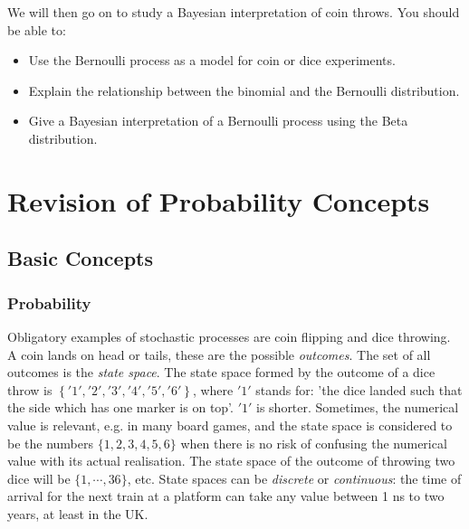 We will then go on to study a Bayesian interpretation of coin throws. You
should be able to:

\begin{itemize}
\item Use the Bernoulli process as a model for coin or dice experiments.
\item Explain the relationship between the binomial and the Bernoulli distribution.
\item Give a Bayesian interpretation of a Bernoulli process using the Beta distribution.
\end{itemize}

\chapter{Revision of Probability Concepts}
\section{Basic Concepts}
\subsection{Probability}

Obligatory examples of stochastic processes are coin flipping and dice throwing.
A coin lands on head or tails, these are the possible \emph{outcomes}. The set of all
outcomes is the \emph{state space}.  The state space formed by the outcome of a dice
throw is $\left\{ '1', '2', '3', '4', '5','6' \right\}$, where $'1'$ stands for:
'the dice landed such that the side which has one marker is on top'. $'1'$ is shorter.
Sometimes, the numerical value is relevant, e.g. in many board games, and the
state space is considered to be the numbers $\{1,  2, 3, 4, 5, 6\}$ when there is no
risk of confusing the numerical value with its actual realisation. The state space
of the outcome of throwing two dice will be $\{1, \cdots, 36 \}$, etc.
State spaces can be \emph{discrete} or \emph{continuous}: the time of arrival for the
next train at a platform can take any value between 1 ns to two years, at least in the UK.

